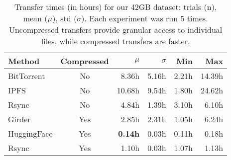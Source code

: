 \documentclass{article}
\begin{document}


\begin{table}[t]
\caption{
Transfer times (in hours) for our 42GB dataset: trials (n), mean ($\mu$), std ($\sigma$).
Each experiment was run 5 times.
Uncompressed transfers provide granular access to individual files, while compressed transfers are faster.
}
\label{tab:transfertime}
\centering
\setlength{\tabcolsep}{4.5pt} %
\begin{tabular}{lcrrrr}
\toprule
Method       & Compressed & $\mu$     & $\sigma$ & Min    & Max     \\
\midrule       
BitTorrent   & No         & 8.36h     & 5.16h    & 2.21h  & 14.39h  \\
IPFS         & No         & 10.68h    & 9.54h    & 1.80h  & 24.62h  \\
Rsync        & No         & 4.84h     & 1.39h    & 3.10h  & 6.10h   \\
Girder       & Yes        & 2.85h     & 2.31h    & 1.05h  & 6.24h   \\
HuggingFace  & Yes        & \bf{0.14h}& 0.03h    & 0.11h  & 0.18h   \\
Rsync        & Yes        & 1.10h     & 0.03h    & 1.07h  & 1.13h   \\
\bottomrule
\end{tabular}
\end{table}
\end{document}
